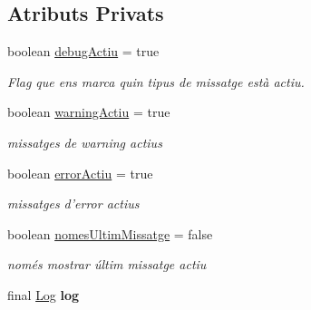 \subsection*{Atributs Privats}
\begin{DoxyCompactItemize}
\item 
boolean \hyperlink{classinterficie_1_1_f_log_af5162801c906c6bd7b8f52723e4dcffe}{debug\+Actiu} = true
\begin{DoxyCompactList}\small\item\em Flag que ens marca quin tipus de missatge està actiu. \end{DoxyCompactList}\item 
\hypertarget{classinterficie_1_1_f_log_ade6a5426cff759fc17c0bf69ba436c5f}{boolean \hyperlink{classinterficie_1_1_f_log_ade6a5426cff759fc17c0bf69ba436c5f}{warning\+Actiu} = true}\label{classinterficie_1_1_f_log_ade6a5426cff759fc17c0bf69ba436c5f}

\begin{DoxyCompactList}\small\item\em missatges de warning actius \end{DoxyCompactList}\item 
\hypertarget{classinterficie_1_1_f_log_a71c862cbee48b0f5a81dbab8c048dfb9}{boolean \hyperlink{classinterficie_1_1_f_log_a71c862cbee48b0f5a81dbab8c048dfb9}{error\+Actiu} = true}\label{classinterficie_1_1_f_log_a71c862cbee48b0f5a81dbab8c048dfb9}

\begin{DoxyCompactList}\small\item\em missatges d'error actius \end{DoxyCompactList}\item 
\hypertarget{classinterficie_1_1_f_log_a31329112410d3afd9a40a210a9142dcb}{boolean \hyperlink{classinterficie_1_1_f_log_a31329112410d3afd9a40a210a9142dcb}{nomes\+Ultim\+Missatge} = false}\label{classinterficie_1_1_f_log_a31329112410d3afd9a40a210a9142dcb}

\begin{DoxyCompactList}\small\item\em només mostrar últim missatge actiu \end{DoxyCompactList}\item 
\hypertarget{classinterficie_1_1_f_log_a573b1722a005456cd98fa5bda146cd07}{final \hyperlink{classlogica_1_1log_1_1_log}{Log} {\bfseries log}}\label{classinterficie_1_1_f_log_a573b1722a005456cd98fa5bda146cd07}

\end{DoxyCompactItemize}


